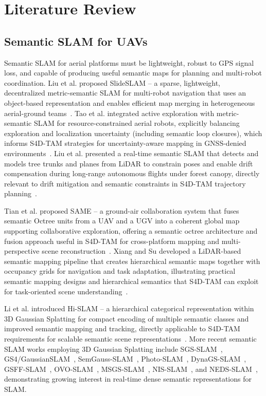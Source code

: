 \section{Literature Review}
\label{sec:literature_review}

\subsection{Semantic SLAM for UAVs}
\label{subsec:semantic_slam}

Semantic SLAM for aerial platforms must be lightweight, robust to GPS signal loss, and capable of producing useful semantic maps for planning and multi-robot coordination. Liu et al. proposed SlideSLAM -- a sparse, lightweight, decentralized metric-semantic SLAM for multi-robot navigation that uses an object-based representation and enables efficient map merging in heterogeneous aerial-ground teams~\cite{liu2024slideslam}. Tao et al. integrated active exploration with metric-semantic SLAM for resource-constrained aerial robots, explicitly balancing exploration and localization uncertainty (including semantic loop closures), which informs S4D-TAM strategies for uncertainty-aware mapping in GNSS-denied environments~\cite{tao2024active}. Liu et al. presented a real-time semantic SLAM that detects and models tree trunks and planes from LiDAR to constrain poses and enable drift compensation during long-range autonomous flights under forest canopy, directly relevant to drift mitigation and semantic constraints in S4D-TAM trajectory planning~\cite{liu2022largescale}.

Tian et al. proposed SAME -- a ground-air collaboration system that fuses semantic Octree units from a UAV and a UGV into a coherent global map supporting collaborative exploration, offering a semantic octree architecture and fusion approach useful in S4D-TAM for cross-platform mapping and multi-perspective scene reconstruction~\cite{tian2024same}. Xiang and Su developed a LiDAR-based semantic mapping pipeline that creates hierarchical semantic maps together with occupancy grids for navigation and task adaptation, illustrating practical semantic mapping designs and hierarchical semantics that S4D-TAM can exploit for task-oriented scene understanding~\cite{xiang2021customizable}.

Li et al. introduced Hi-SLAM -- a hierarchical categorical representation within 3D Gaussian Splatting for compact encoding of multiple semantic classes and improved semantic mapping and tracking, directly applicable to S4D-TAM requirements for scalable semantic scene representations~\cite{li2024hislam, keetha2024splatam}. More recent semantic SLAM works employing 3D Gaussian Splatting include SGS-SLAM~\cite{hu2024sgsslam}, GS4/GaussianSLAM~\cite{yugay2023gaussianslam}, SemGauss-SLAM~\cite{zou2024semgaussslam}, Photo-SLAM~\cite{huang2024photoslam}, DynaGS-SLAM~\cite{wu2024dynags}, GSFF-SLAM~\cite{pan2024gsffslam}, OVO-SLAM~\cite{haghighi2024ovoslam}, MSGS-SLAM~\cite{li2024msgsslam}, NIS-SLAM~\cite{li2024nisslam}, and NEDS-SLAM~\cite{dai2024nedsslam}, demonstrating growing interest in real-time dense semantic representations for SLAM.

